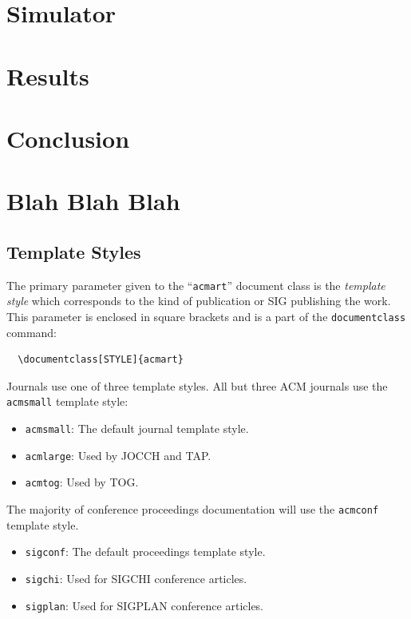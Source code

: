 \documentclass[acmlarge]{acmart}
\begin{document}
\section{Simulator}

\section{Results}

\section{Conclusion}

\section{Blah Blah Blah}

\subsection{Template Styles}

The primary parameter given to the ``\verb|acmart|'' document class is
the {\itshape template style} which corresponds to the kind of publication
or SIG publishing the work. This parameter is enclosed in square
brackets and is a part of the {\verb|documentclass|} command:
\begin{verbatim}
  \documentclass[STYLE]{acmart}
\end{verbatim}

Journals use one of three template styles. All but three ACM journals
use the {\verb|acmsmall|} template style:
\begin{itemize}
\item {\texttt{acmsmall}}: The default journal template style.
\item {\texttt{acmlarge}}: Used by JOCCH and TAP.
\item {\texttt{acmtog}}: Used by TOG.
\end{itemize}

The majority of conference proceedings documentation will use the {\verb|acmconf|} template style.
\begin{itemize}
\item {\texttt{sigconf}}: The default proceedings template style.
\item{\texttt{sigchi}}: Used for SIGCHI conference articles.
\item{\texttt{sigplan}}: Used for SIGPLAN conference articles.
\end{itemize}
\end{document}
